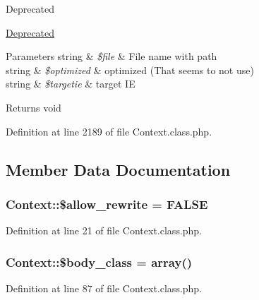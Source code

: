 \begin{DoxyRefDesc}{Deprecated}
\item[\hyperlink{deprecated__deprecated000005}{Deprecated}]
\begin{DoxyParams}[1]{Parameters}
string & {\em \$file} & File name with path \\
\hline
string & {\em \$optimized} & optimized (That seems to not use) \\
\hline
string & {\em \$targetie} & target I\+E \\
\hline
\end{DoxyParams}
\begin{DoxyReturn}{Returns}
void 
\end{DoxyReturn}
\end{DoxyRefDesc}


Definition at line 2189 of file Context.\+class.\+php.



\subsection{Member Data Documentation}
\hypertarget{classContext_a24355a0c151bd3285c45254f773af275}{}
\subsubsection[{\$allow\+\_\+rewrite}]{\setlength{\rightskip}{0pt plus 5cm}Context\+::\$allow\+\_\+rewrite = F\+A\+L\+S\+E}\label{classContext_a24355a0c151bd3285c45254f773af275}


Definition at line 21 of file Context.\+class.\+php.

\hypertarget{classContext_af0bb833a3157d6d2153d7858cb60e435}{}
\subsubsection[{\$body\+\_\+class}]{\setlength{\rightskip}{0pt plus 5cm}Context\+::\$body\+\_\+class = array()}\label{classContext_af0bb833a3157d6d2153d7858cb60e435}


Definition at line 87 of file Context.\+class.\+php.

\hypertarget{classContext_aa2c90f49a1f6389eadea8962d0fbf5b3}{}
